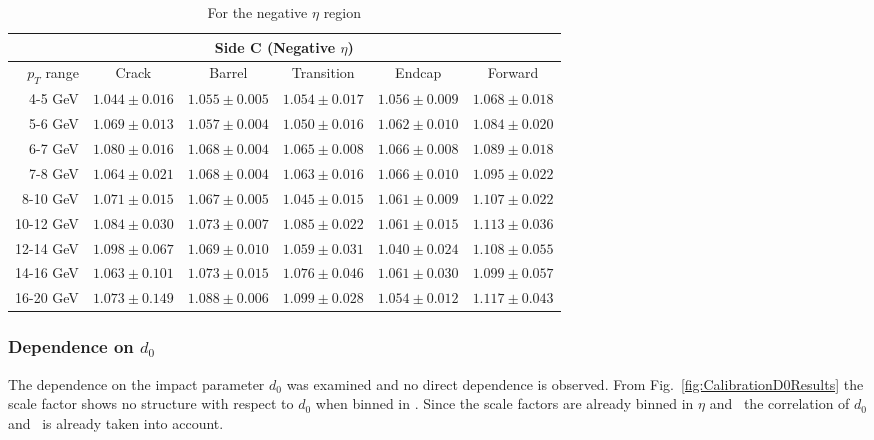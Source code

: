 \begin{table}[bhtp]
  \begin{subtable}{\textwidth}
    \centering
    \begin{tabular}{|r|c|c|c|c|c|}
    \hline
    \multicolumn{6}{|c|}{Side C (Negative $\eta$)} \\
    \hline
    $p_{T}$ range & Crack & Barrel & Transition & Endcap & Forward\\ \hline \hline
    4-5 GeV   & $1.044\pm0.016$ & $1.055\pm0.005$ & $1.054\pm0.017$ & $1.056\pm0.009$ & $1.068\pm0.018$ \\
    5-6 GeV   & $1.069\pm0.013$ & $1.057\pm0.004$ & $1.050\pm0.016$ & $1.062\pm0.010$ & $1.084\pm0.020$ \\
    6-7 GeV   & $1.080\pm0.016$ & $1.068\pm0.004$ & $1.065\pm0.008$ & $1.066\pm0.008$ & $1.089\pm0.018$ \\
    7-8 GeV   & $1.064\pm0.021$ & $1.068\pm0.004$ & $1.063\pm0.016$ & $1.066\pm0.010$ & $1.095\pm0.022$ \\
    8-10 GeV  & $1.071\pm0.015$ & $1.067\pm0.005$ & $1.045\pm0.015$ & $1.061\pm0.009$ & $1.107\pm0.022$ \\
    10-12 GeV & $1.084\pm0.030$ & $1.073\pm0.007$ & $1.085\pm0.022$ & $1.061\pm0.015$ & $1.113\pm0.036$ \\
    12-14 GeV & $1.098\pm0.067$ & $1.069\pm0.010$ & $1.059\pm0.031$ & $1.040\pm0.024$ & $1.108\pm0.055$ \\
    14-16 GeV & $1.063\pm0.101$ & $1.073\pm0.015$ & $1.076\pm0.046$ & $1.061\pm0.030$ & $1.099\pm0.057$ \\
    16-20 GeV & $1.073\pm0.149$ & $1.088\pm0.006$ & $1.099\pm0.028$ & $1.054\pm0.012$ & $1.117\pm0.043$ \\
    \hline
    \end{tabular}
    \caption{For the negative $\eta$ region} \label{tab:Calibration2012SFNeg}
  \end{subtable}
\end{table}

\subsubsection{Dependence on $d_{0}$}

The dependence on the impact parameter $d_{0}$ was examined and no direct dependence is observed. From Fig.~\ref{fig:CalibrationD0Results} the scale factor shows no structure with respect to $d_0$ when binned in \pt. Since the scale factors are already binned in $\eta$ and \pt\ the correlation of $d_0$ and \pt\ is already taken into account.

